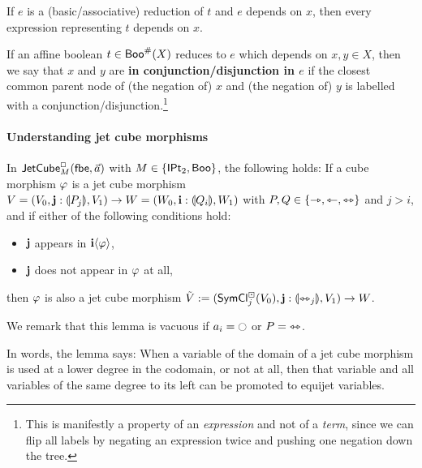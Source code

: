 \documentclass[a4paper]{memoir}
\begin{document}
\begin{corollary} \label{thm:reduction-minimal-deps}
	If $e$ is a (basic/associative) reduction of $t$ and $e$ depends on $x$, then every expression representing $t$ depends on $x$. \qedhere
\end{corollary}
\begin{definition} \label{def:in-connection}
	If an affine boolean $t \in \mathsf{Boo}^\#(X)$ reduces to $e$ which depends on $x, y \in X$, then we say that $x$ and $y$ are \textbf{in conjunction/disjunction in $e$} if the closest common parent node of (the negation of) $x$ and (the negation of) $y$ is labelled with a conjunction/disjunction.\footnote{This is manifestly a property of an \emph{expression} and not of a \emph{term}, since we can flip all labels by negating an expression twice and pushing one negation down the tree.} 
\end{definition}

\paragraph{Understanding jet cube morphisms}
\begin{lemma} \label{thm:left-of-concursor}
	In $\mathsf{JetCube}^{\Box}_{M}\mathopen{}\left( {\mathsf{fbe}},\vec a \right)\mathclose{}$ with $M \in \mathopen{}\left\{ {\mathsf{IPt}_2}, \mathsf{Boo} \right\}\mathclose{}$,
	the following holds:
	If a cube morphism $\varphi$ is a jet cube morphism $V = (V_0, \mathbf{j} : {\llparenthesis P_j \rrparenthesis}, V_1) \to W = (W_0, \mathbf{i} : {\llparenthesis Q_i \rrparenthesis}, W_1)$ with $P, Q \in \mathopen{}\left\{ \rightarrowtriangle, \leftarrowtriangle, \leftrightarrowtriangle \right\}\mathclose{}$ and $j > i$,
	and if either of the following conditions hold:
	\begin{itemize}
		\item $\mathbf{j}$ appears in $\mathbf{i} \langle \varphi \rangle$,
		\item $\mathbf{j}$ does not appear in $\varphi$ at all,
	\end{itemize}
	then $\varphi$ is also a jet cube morphism
	$\tilde V := (\mathsf{SymCl}^\boxdot_j(V_0), \mathbf{j} : {\llparenthesis \leftrightarrowtriangle_j \rrparenthesis}, V_1) \to W$.
\end{lemma}
We remark that this lemma is vacuous if $a_i = \npolar$ or $P = {\leftrightarrowtriangle}$.

In words, the lemma says: When a variable of the domain of a jet cube morphism is used at a lower degree in the codomain, or not at all, then that variable and all variables of the same degree to its left can be promoted to equijet variables.
\end{document}

